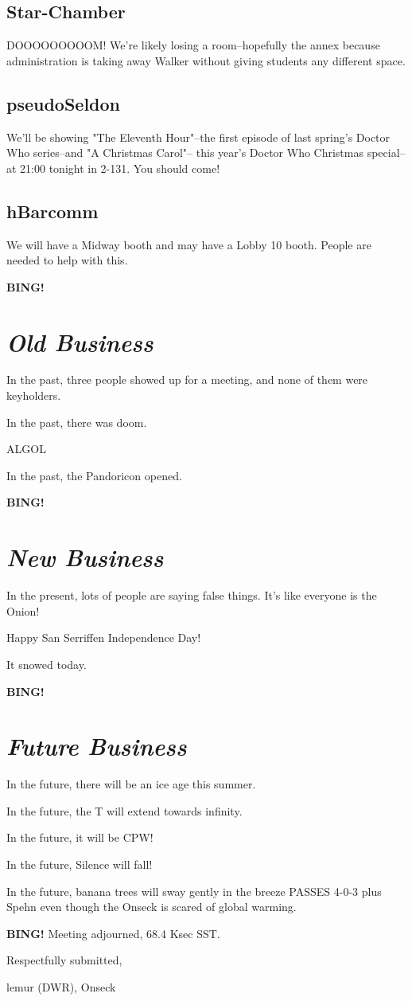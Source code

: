 \documentclass[10pt]{article}
\newcommand{\bing}{{\bf BING!} }
\newcommand{\goto}[1]{\bing \vskip 12pt \section*{{\em{#1}}}}
\newcommand{\ps}{ plus Spehn\xspace}
\newcommand{\onseck}{lemur (DWR), Onseck}
\begin{document}
\subsection*{Star-Chamber}

DOOOOOOOOOM!  We're likely losing a room--hopefully the annex
because administration is taking away Walker without giving
students any different space.


\subsection*{pseudoSeldon}

We'll be showing "The Eleventh Hour"--the first episode of 
last spring's Doctor Who series--and "A Christmas Carol"--
this year's Doctor Who Christmas special--at 21:00 tonight
in 2-131.  You should come!


\subsection*{hBarcomm}

We will have a Midway booth and may have a Lobby 10 booth.
People are needed to help with this.


\goto{Old Business}

In the past, three people showed up for a meeting, and none
of them were keyholders.

In the past, there was doom.

ALGOL

In the past, the Pandoricon opened.


\goto{New Business}

In the present, lots of people are saying false things.  It's like
everyone is the Onion!

Happy San Serriffen Independence Day!

It snowed today.


\goto{Future Business}

In the future, there will be an ice age this summer.

In the future, the T will extend towards infinity.

In the future, it will be CPW!

In the future, Silence will fall!

In the future, banana trees will sway gently in
the breeze PASSES 4-0-3\ps even though the Onseck
is scared of global warming.

\bing
\noindent
Meeting adjourned, 68.4 Ksec SST.

\vspace{18pt}

\centerline{Respectfully submitted,}
\centerline{\onseck}
\end{document}
